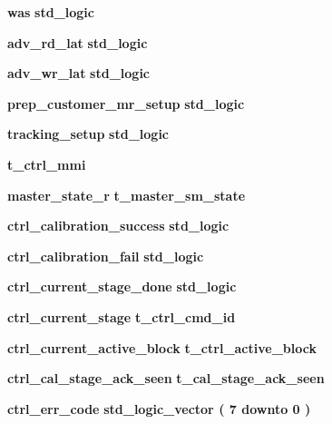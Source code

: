 \begin{DoxyCompactItemize}
{\bf was} {\bfseries {\bfseries \textcolor{comment}{std\+\_\+logic}\textcolor{vhdlchar}{ }}} 
\item 
{\bf adv\+\_\+rd\+\_\+lat} {\bfseries {\bfseries \textcolor{comment}{std\+\_\+logic}\textcolor{vhdlchar}{ }}} 
\item 
{\bf adv\+\_\+wr\+\_\+lat} {\bfseries {\bfseries \textcolor{comment}{std\+\_\+logic}\textcolor{vhdlchar}{ }}} 
\item 
{\bf prep\+\_\+customer\+\_\+mr\+\_\+setup} {\bfseries {\bfseries \textcolor{comment}{std\+\_\+logic}\textcolor{vhdlchar}{ }}} 
\item 
{\bf tracking\+\_\+setup} {\bfseries {\bfseries \textcolor{comment}{std\+\_\+logic}\textcolor{vhdlchar}{ }}} 
\item 
{\bf t\+\_\+ctrl\+\_\+mmi} {\bfseries  }
\item 
{\bf master\+\_\+state\+\_\+r} {\bfseries {\bfseries {\bfseries {\bf t\+\_\+master\+\_\+sm\+\_\+state}} \textcolor{vhdlchar}{ }}} 
\item 
{\bf ctrl\+\_\+calibration\+\_\+success} {\bfseries {\bfseries \textcolor{comment}{std\+\_\+logic}\textcolor{vhdlchar}{ }}} 
\item 
{\bf ctrl\+\_\+calibration\+\_\+fail} {\bfseries {\bfseries \textcolor{comment}{std\+\_\+logic}\textcolor{vhdlchar}{ }}} 
\item 
{\bf ctrl\+\_\+current\+\_\+stage\+\_\+done} {\bfseries {\bfseries \textcolor{comment}{std\+\_\+logic}\textcolor{vhdlchar}{ }}} 
\item 
{\bf ctrl\+\_\+current\+\_\+stage} {\bfseries {\bfseries {\bfseries {\bf t\+\_\+ctrl\+\_\+cmd\+\_\+id}} \textcolor{vhdlchar}{ }}} 
\item 
{\bf ctrl\+\_\+current\+\_\+active\+\_\+block} {\bfseries {\bfseries {\bfseries {\bf t\+\_\+ctrl\+\_\+active\+\_\+block}} \textcolor{vhdlchar}{ }}} 
\item 
{\bf ctrl\+\_\+cal\+\_\+stage\+\_\+ack\+\_\+seen} {\bfseries {\bfseries {\bfseries {\bf t\+\_\+cal\+\_\+stage\+\_\+ack\+\_\+seen}} \textcolor{vhdlchar}{ }}} 
\item 
{\bf ctrl\+\_\+err\+\_\+code} {\bfseries {\bfseries \textcolor{comment}{std\+\_\+logic\+\_\+vector}\textcolor{vhdlchar}{ }\textcolor{vhdlchar}{(}\textcolor{vhdlchar}{ }\textcolor{vhdlchar}{ } \textcolor{vhdldigit}{7} \textcolor{vhdlchar}{ }\textcolor{keywordflow}{downto}\textcolor{vhdlchar}{ }\textcolor{vhdlchar}{ } \textcolor{vhdldigit}{0} \textcolor{vhdlchar}{ }\textcolor{vhdlchar}{)}\textcolor{vhdlchar}{ }}} 
\item 

\end{DoxyCompactItemize}
